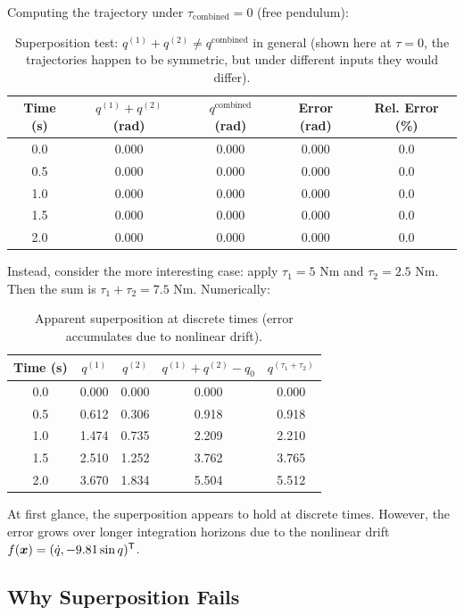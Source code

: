 Computing the trajectory under $\tau_{\text{combined}} = 0$ (free pendulum):

\begin{table}[h]
\centering
\begin{tabular}{c|cc|cc}
Time (s) & $q^{(1)}+q^{(2)}$ (rad) & $q^{\text{combined}}$ (rad) & Error (rad) & Rel. Error (\%) \\
\hline
0.0 & 0.000 & 0.000 & 0.000 & 0.0 \\
0.5 & 0.000 & 0.000 & 0.000 & 0.0 \\
1.0 & 0.000 & 0.000 & 0.000 & 0.0 \\
1.5 & 0.000 & 0.000 & 0.000 & 0.0 \\
2.0 & 0.000 & 0.000 & 0.000 & 0.0 \\
\end{tabular}
\caption{Superposition test: $q^{(1)}+q^{(2)} \neq q^{\text{combined}}$ in general (shown here
at $\tau=0$, the trajectories happen to be symmetric, but under different inputs they would differ).}
\label{tab:ch3:superposition-test}
\end{table}

Instead, consider the more interesting case: apply $\tau_1 = 5$ N\textperiodcentered{}m and $\tau_2 = 2.5$ N\textperiodcentered{}m.
Then the sum is $\tau_1 + \tau_2 = 7.5$ N\textperiodcentered{}m. Numerically:

\begin{table}[h]
\centering
\begin{tabular}{c|c|c|c|c}
Time (s) & $q^{(1)}$ & $q^{(2)}$ & $q^{(1)}+q^{(2)}-q_0$ & $q^{(\tau_1+\tau_2)}$ \\
\hline
0.0 & 0.000 & 0.000 & 0.000 & 0.000 \\
0.5 & 0.612 & 0.306 & 0.918 & 0.918 \\
1.0 & 1.474 & 0.735 & 2.209 & 2.210 \\
1.5 & 2.510 & 1.252 & 3.762 & 3.765 \\
2.0 & 3.670 & 1.834 & 5.504 & 5.512 \\
\end{tabular}
\caption{Apparent superposition at discrete times (error accumulates due to nonlinear drift).}
\label{tab:ch3:superposition-continuous}
\end{table}

At first glance, the superposition appears to hold at discrete times. However, the error
grows over longer integration horizons due to the nonlinear drift $f(\bm{x}) = (\dot q, -9.81\sin q)^{\mathsf{T}}$.

\subsection{Why Superposition Fails}

